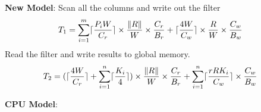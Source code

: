 \noindent \textbf{New Model}: Scan all the columns and write out the filter
\begin{align*}
T_1 &= \sum_{i=1}^{m} \lceil\frac{P_i W}{C_r}\rceil \times \frac{\left\lVert R\right\rVert}{W} \times \frac{C_r}{B_r}  +  \lceil\frac{4 W}{C_w}\rceil \times \frac{R}{W} \times \frac{C_w}{B_w}
\end{align*}
Read the filter and write results to global memory.
\begin{align*}
T_2 &= (\lceil\frac{4 W}{C_r}\rceil + \sum_{i=1}^{n} \lceil\frac{K_i}{4}\rceil) \times \frac{\left\lVert R\right\rVert}{W} \times \frac{C_r}{B_r} + \sum_{i=1}^{n} \lceil\frac{r R K_i}{C_w}\rceil \times \frac{C_w}{B_w}
\end{align*}

\noindent \textbf{CPU Model}:






